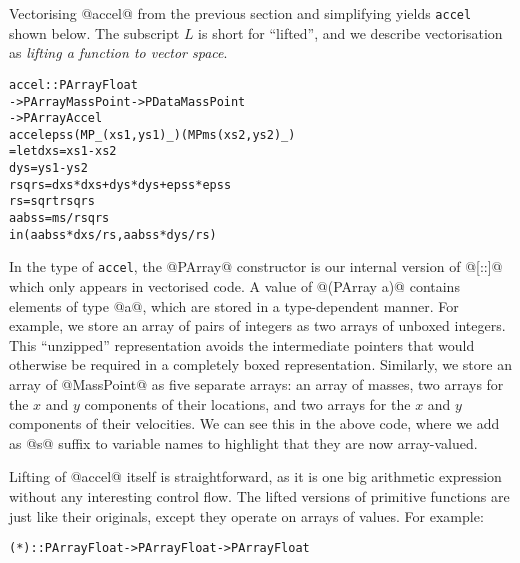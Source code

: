 Vectorising @accel@ from the previous section and simplifying yields \texttt{accel} shown below. The subscript $L$ is short for ``lifted'', and we describe vectorisation as \emph{lifting a function to vector space}. 
%
\begin{small}
\begin{alltt}
 accel :: PArray Float 
         -> PArray MassPoint -> PData MassPoint 
         -> PArray Accel
 accel epss (MP _ (xs1,ys1) _) (MP ms (xs2,ys2) _)
  = let dxs   = xs1 - xs2 
        dys   = ys1 - ys2 
        rsqrs = dxs * dxs + dys * dys + epss * epss
        rs    = sqrt rsqrs 
        aabss = ms  / rsqrs 
    in  (aabss * dxs / rs , aabss * dys / rs)  
\end{alltt}
\end{small}
%
In the type of \texttt{accel}, the @PArray@ constructor is our internal version of @[::]@ which only appears in vectorised code. A value of @(PArray a)@ contains elements of type @a@, which are stored in a type-dependent manner. For example, we store an array of pairs of integers as two arrays of unboxed integers. This ``unzipped'' representation avoids the intermediate pointers that would otherwise be required in a completely boxed representation. Similarly, we store an array of @MassPoint@ as five separate arrays: an array of masses, two arrays for the $x$ and $y$ components of their locations, and two arrays for the $x$ and $y$ components of their velocities. We can see this in the above code, where we add as @s@ suffix to variable names to highlight that they are now array-valued.
%
%

Lifting of @accel@ itself is straightforward, as it is one big arithmetic expression without any interesting control flow. The lifted versions of primitive functions are just like their originals, except they operate on arrays of values. For example:
%
\begin{small}
\begin{alltt}
  (*) :: PArray Float -> PArray Float -> PArray Float
\end{alltt}
\end{small}

